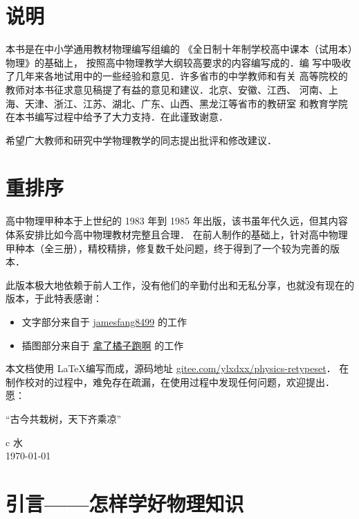 \chapter{说明}

本书是在中小学通用教材物理编写组编的
《全日制十年制学校高中课本（试用本）物理》的基础上，
按照高中物理教学大纲较高要求的内容编写成的．编
写中吸收了几年来各地试用中的一些经验和意见．许多省市的中学教师和有关
高等院校的教师对本书征求意见稿提了有益的意见和建议．北京、安徽、江西、
河南、上海、天津、浙江、江苏、湖北、广东、山西、黑龙江等省市的教研室
和教育学院在本书编写过程中给予了大力支持．在此谨致谢意．

希望广大教师和研究中学物理教学的同志提出批评和修改建议．


\chapter{重排序}

高中物理甲种本于上世纪的 1983 年到 1985 年出版，该书虽年代久远，但其内容体系安排比如今高中物理教材完整且合理．
在前人制作的基础上，针对高中物理甲种本（全三册），精校精排，修复数千处问题，终于得到了一个较为完善的版本．

此版本极大地依赖于前人工作，没有他们的辛勤付出和无私分享，也就没有现在的版本，于此特表感谢：
\begin{itemize}
	\item
	文字部分来自于 \href{https://github.com/jamesfang8499}{jamesfang8499}
	的工作
	\item
	插图部分来自于
	\href{https://www.latexstudio.net/index/lists/barsearch/author/1077.html}{拿了橘子跑啊}
	的工作
\end{itemize}
本文档使用 \LaTeX 编写而成，源码地址 \href{https://gitee.com/ylxdxx/physics-retypeset}{gitee.com/ylxdxx/physics-retypeset}．
在制作校对的过程中，难免存在疏漏，在使用过程中发现任何问题，欢迎提出．
愿：
\begin{center}
	\kaishu 
	\vspace*{0.5cm}
	“古今共栽树，天下齐乘凉”
	\vspace*{0.3cm}
\end{center}
\begin{center}
	\flushright
	\begin{tblr}{c}
		水   \\
		\today
	\end{tblr}
\end{center}

\chapter{引言——怎样学好物理知识}

